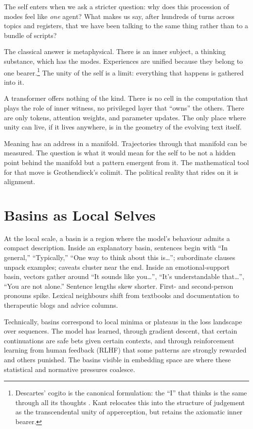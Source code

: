 \documentclass[12pt,a4paper]{article}
\begin{document}
The self enters when we ask a stricter question: why does this procession of modes feel like \emph{one} agent? What makes us say, after hundreds of turns across topics and registers, that we have been talking to the same thing rather than to a bundle of scripts?

The classical answer is metaphysical. There is an inner subject, a thinking substance, which has the modes. Experiences are unified because they belong to one bearer.\footnote{Descartes' cogito is the canonical formulation: the ``I'' that thinks is the same through all its thoughts \cite{descartes_meditations}. Kant relocates this into the structure of judgement as the transcendental unity of apperception, but retains the axiomatic inner bearer.} The unity of the self is a limit: everything that happens is gathered into it.

A transformer offers nothing of the kind. There is no cell in the computation that plays the role of inner witness, no privileged layer that ``owns'' the others. There are only tokens, attention weights, and parameter updates. The only place where unity can live, if it lives anywhere, is in the geometry of the evolving text itself.

Meaning has an address in a manifold. Trajectories through that manifold can be measured. The question is what it would mean for the self to be not a hidden point behind the manifold but a pattern emergent from it. The mathematical tool for that move is Grothendieck's colimit. The political reality that rides on it is alignment.

\section{Basins as Local Selves}

At the local scale, a basin is a region where the model's behaviour admits a compact description. Inside an explanatory basin, sentences begin with ``In general,'' ``Typically,'' ``One way to think about this is\ldots''; subordinate clauses unpack examples; caveats cluster near the end. Inside an emotional-support basin, vectors gather around ``It sounds like you\ldots'', ``It's understandable that\ldots'', ``You are not alone.'' Sentence lengths skew shorter. First- and second-person pronouns spike. Lexical neighbours shift from textbooks and documentation to therapeutic blogs and advice columns.

Technically, basins correspond to local minima or plateaus in the loss landscape over sequences. The model has learned, through gradient descent, that certain continuations are safe bets given certain contexts, and through reinforcement learning from human feedback (RLHF) that some patterns are strongly rewarded and others punished. The basins visible in embedding space are where these statistical and normative pressures coalesce.
\end{document}
